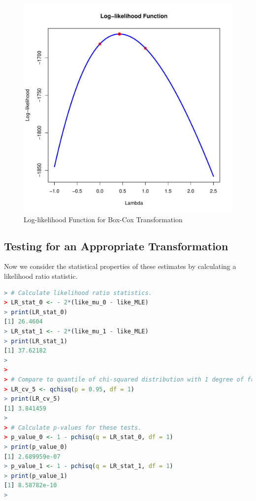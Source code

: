 \begin{figure}[h!]
  \centering
  \includegraphics[scale = 0.5, keepaspectratio=true]{../Figures/box_cox_loglike_uni}
  \caption{Log-likelihood Function for Box-Cox Transformation} \label{fig:box_cox_loglike_uni}
\end{figure}


\pagebreak
\subsection{Testing for an Appropriate Transformation}

Now we consider the statistical properties of these estimates
by calculating a likelihood ratio statistic.

\begin{lstlisting}[language=R]
> # Calculate likelihood ratio statistics.
> LR_stat_0 <- - 2*(like_mu_0 - like_MLE)
> print(LR_stat_0)
[1] 26.4604
> LR_stat_1 <- - 2*(like_mu_1 - like_MLE)
> print(LR_stat_1)
[1] 37.62182
> 
> 
> # Compare to quantile of chi-squared distribution with 1 degree of freedom.
> LR_cv_5 <- qchisq(p = 0.95, df = 1)
> print(LR_cv_5)
[1] 3.841459
> 
> # Calculate p-values for these tests.
> p_value_0 <- 1 - pchisq(q = LR_stat_0, df = 1)
> print(p_value_0)
[1] 2.689959e-07
> p_value_1 <- 1 - pchisq(q = LR_stat_1, df = 1)
> print(p_value_1)
[1] 8.58782e-10
> 
\end{lstlisting}


